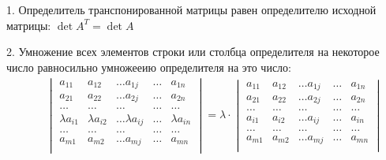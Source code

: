 \documentclass[12pt, fleqn]{extarticle}
\begin{document}
1. Определитель транспонированной матрицы равен определителю исходной матрицы: \(\det A^T = \det A\)

2. Умножение всех элементов строки или столбца определителя на некоторое число \lambda равносильно умножееию определителя на это число:
\begin{align*}
     &  &
    \begin{vmatrix}
        a_{11}         & a_{12}         & \dots a_{1j}         & \dots & a_{1n}         \\
        a_{21}         & a_{22}         & \dots a_{2j}         & \dots & a_{2n}         \\
        \dots          & \dots          & \dots                & \dots & \dots          \\
        \lambda a_{i1} & \lambda a_{i2} & \dots \lambda a_{ij} & \dots & \lambda a_{in} \\
        \dots          & \dots          & \dots                & \dots & \dots          \\
        a_{m1}         & a_{m2}         & \dots a_{mj}         & \dots & a_{mn}         \\
    \end{vmatrix}
    =
    \lambda \cdot
    \begin{vmatrix}
        a_{11} & a_{12} & \dots a_{1j} & \dots & a_{1n} \\
        a_{21} & a_{22} & \dots a_{2j} & \dots & a_{2n} \\
        \dots  & \dots  & \dots        & \dots & \dots  \\
        a_{i1} & a_{i2} & \dots a_{ij} & \dots & a_{in} \\
        \dots  & \dots  & \dots        & \dots & \dots  \\
        a_{m1} & a_{m2} & \dots a_{mj} & \dots & a_{mn} \\
    \end{vmatrix}
\end{align*}
\end{document}
